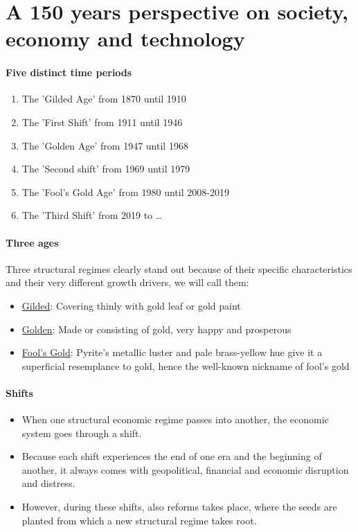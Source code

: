 \section{A 150 years perspective on society, economy and technology}


\paragraph{Five distinct time periods}

\begin{enumerate}
    \item The 'Gilded Age' from 1870 until 1910
    \item The 'First Shift' from 1911 until 1946
    \item The 'Golden Age' from 1947 until 1968
    \item The 'Second shift' from 1969 until 1979
    \item The 'Fool's Gold Age' from 1980 until 2008-2019
    \item The 'Third Shift' from 2019 to \dots
\end{enumerate}

\paragraph{Three ages}
Three structural regimes clearly stand out because of their specific
characteristics and their very different growth drivers, we will call them:
\begin{itemize}
    \item \underline{Gilded}: Covering thinly with gold leaf or gold paint
    \item \underline{Golden}: Made or consisting of gold, very happy and prosperous
    \item \underline{Fool's Gold}: Pyrite's metallic luster and pale brass-yellow
        hue give it a superficial resemplance to gold, hence the well-known
        nickname of fool's gold
\end{itemize}

\paragraph{Shifts}
\begin{itemize}
    \item When one structural economic regime passes into another, the
        economic system goes through a shift.
    \item Because each shift experiences the end of one era and the
        beginning of another, it always comes with geopolitical,
        financial and economic disruption and distress.
    \item However, during these shifts, also reforms takes place, where
        the seeds are planted from which a new structural regime takes
        root.
\end{itemize}

